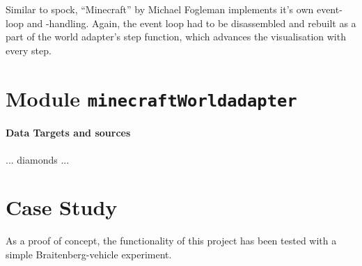 Similar to spock, ``Minecraft'' by Michael Fogleman implements it's own event-loop and -handling. Again, the event loop had to be disassembled and rebuilt as a part of the world adapter's step function, which advances the visualisation with every step.

    \section{Module \texttt{minecraftWorldadapter}}
    
\paragraph{Data Targets and sources}

... diamonds ...



    \section{Case Study}
As a proof of concept, the functionality of this project has been tested with a simple Braitenberg-vehicle experiment.